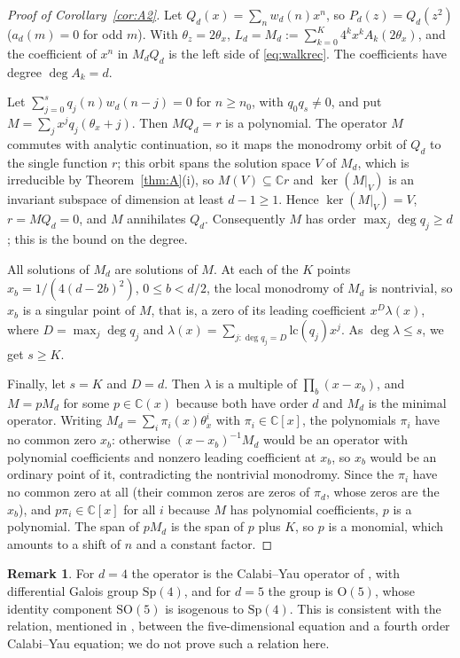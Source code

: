 \documentclass[11pt]{amsart}
\theoremstyle{definition}
\newtheorem{remark}[thm]{Remark}
\newcommand{\C}{\mathbb C}
\newcommand{\Sp}{\mathrm{Sp}}
\newcommand{\SO}{\mathrm{SO}}
\newcommand{\Ort}{\mathrm{O}}
\newcommand{\lc}{\mathrm{lc}}
\begin{document}
\begin{proof}[Proof of Corollary~\ref{cor:A2}]
Let $Q_d(x)=\sum_nw_d(n)x^n$, so $P_d(z)=Q_d(z^2)$ ($a_d(m)=0$ for odd $m$). With $\theta_z=2\theta_x$, $L_d=M_d:=\sum_{k=0}^K4^kx^kA_k(2\theta_x)$, and the coefficient of $x^n$ in $M_dQ_d$ is the left side of \eqref{eq:walkrec}. The coefficients have degree $\deg A_k=d$.

Let $\sum_{j=0}^sq_j(n)w_d(n-j)=0$ for $n\ge n_0$, with $q_0q_s\ne0$, and put $M=\sum_jx^jq_j(\theta_x+j)$. Then $MQ_d=r$ is a polynomial. The operator $M$ commutes with analytic continuation, so it maps the monodromy orbit of $Q_d$ to the single function $r$; this orbit spans the solution space $V$ of $M_d$, which is irreducible by Theorem~\ref{thm:A}(i), so $M(V)\subseteq\C r$ and $\ker(M|_V)$ is an invariant subspace of dimension at least $d-1\ge1$. Hence $\ker(M|_V)=V$, $r=MQ_d=0$, and $M$ annihilates $Q_d$. Consequently $M$ has order $\max_j\deg q_j\ge d$; this is the bound on the degree.

All solutions of $M_d$ are solutions of $M$. At each of the $K$ points $x_b=1/(4(d-2b)^2)$, $0\le b<d/2$, the local monodromy of $M_d$ is nontrivial, so $x_b$ is a singular point of $M$, that is, a zero of its leading coefficient $x^{D}\lambda(x)$, where $D=\max_j\deg q_j$ and $\lambda(x)=\sum_{j:\deg q_j=D}\lc(q_j)x^j$. As $\deg\lambda\le s$, we get $s\ge K$.

Finally, let $s=K$ and $D=d$. Then $\lambda$ is a multiple of $\prod_b(x-x_b)$, and $M=pM_d$ for some $p\in\C(x)$ because both have order $d$ and $M_d$ is the minimal operator. Writing $M_d=\sum_i\pi_i(x)\theta_x^i$ with $\pi_i\in\C[x]$, the polynomials $\pi_i$ have no common zero $x_b$: otherwise $(x-x_b)^{-1}M_d$ would be an operator with polynomial coefficients and nonzero leading coefficient at $x_b$, so $x_b$ would be an ordinary point of it, contradicting the nontrivial monodromy. Since the $\pi_i$ have no common zero at all (their common zeros are zeros of $\pi_d$, whose zeros are the $x_b$), and $p\pi_i\in\C[x]$ for all $i$ because $M$ has polynomial coefficients, $p$ is a polynomial. The span of $pM_d$ is the span of $p$ plus $K$, so $p$ is a monomial, which amounts to a shift of $n$ and a constant factor.
\end{proof}

\begin{remark}
For $d=4$ the operator is the Calabi--Yau operator of \cite[\S2.2]{Gut10}, with differential Galois group $\Sp(4)$, and for $d=5$ the group is $\Ort(5)$, whose identity component $\SO(5)$ is isogenous to $\Sp(4)$. This is consistent with the relation, mentioned in \cite{Gut10}, between the five-dimensional equation and a fourth order Calabi--Yau equation; we do not prove such a relation here.
\end{remark}
\end{document}
